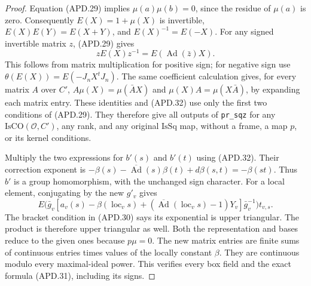 \begin{proof}
Equation (APD.29) implies \(\mu(a)\mu(b)=0\), since the
residue of \(\mu(a)\) is zero.  Consequently
\(E(X)=1+\mu(X)\) is invertible,
\(E(X)E(Y)=E(X+Y)\), and \(E(X)^{-1}=E(-X)\).
For any signed invertible matrix \(z\), (APD.29) gives
\[
 zE(X)z^{-1}=E(\operatorname{Ad}(\bar z)X).                \tag{APD.32}
\]
This follows from matrix multiplication for positive sign; for
negative sign use \(\theta(E(X))=E(-J_nX^tJ_n)\).
The same coefficient calculation gives, for every matrix \(A\)
over \(C'\),
\(A\mu(X)=\mu(\bar A X)\) and
\(\mu(X)A=\mu(X\bar A)\), by expanding each matrix entry.
These identities and (APD.32) use only the first two conditions
of (APD.29).  They therefore give all outputs of
\texttt{pr\_sqz} for any \(\mathrm{IsCO}(\mathcal O,C')\),
any rank, and any original \(\mathrm{IsSq}\) map, without a
frame, a map \(p\), or its kernel conditions.

Multiply the two expressions for \(b'(s)\) and \(b'(t)\)
using (APD.32).  Their correction exponent is
\(-\beta(s)-\overline{\operatorname{Ad}}(s)\beta(t)
 +d\beta(s,t)=-\beta(st)\).  Thus \(b'\) is a group
homomorphism, with the unchanged sign character.  For a local
element, conjugating by the new \(g'_v\) gives
\[
 E\bigl(\bar g_v[
     a_v(s)-\beta(\operatorname{loc}_v s)
       +(\overline{\operatorname{Ad}}(\operatorname{loc}_v s)-1)Y_v
                ]\bar g_v^{-1}\bigr)t_{v,s}.              \tag{APD.33}
\]
The bracket condition in (APD.30) says its exponential is upper
triangular.  The product is therefore upper triangular as well.
Both the representation and bases reduce to the given ones because
\(p\mu=0\).  The new matrix entries are finite sums of
continuous entries times values of the locally constant \(\beta\).
They are continuous modulo every maximal-ideal power.  This
verifies every box field and the exact formula (APD.31), including
its signs.
\end{proof}

